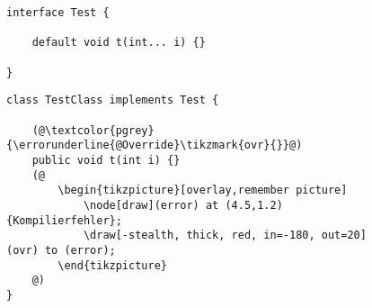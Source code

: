 \begin{figure}[H]
	\noindent
	\begin{adjustbox}{minipage=[t]{.45\linewidth},gstore totalheight=\heightone,margin=\fboxsep+\fboxrule}
		\begin{lstlisting}[caption=Beispiel -- Interfacedeklaration., captionpos=b, label=lst:decl_interface]
interface Test {

	default void t(int... i) {}

}

		\end{lstlisting}
	\end{adjustbox}\hfill
	\begin{adjustbox}{minipage=[t][\heightone]{0.5\linewidth}}
		\begin{lstlisting}[caption=Beispiel -- Kompilierfehler., captionpos=b, label=lst:compiler_error]
class TestClass implements Test {

	(@\textcolor{pgrey}{\errorunderline{@Override}\tikzmark{ovr}{}}@)
	public void t(int i) {}
	(@
		\begin{tikzpicture}[overlay,remember picture]
			\node[draw](error) at (4.5,1.2) {Kompilierfehler};
			\draw[-stealth, thick, red, in=-180, out=20] (ovr) to (error);
		\end{tikzpicture}
	@)
}
		\end{lstlisting}
	\end{adjustbox}
\end{figure}
